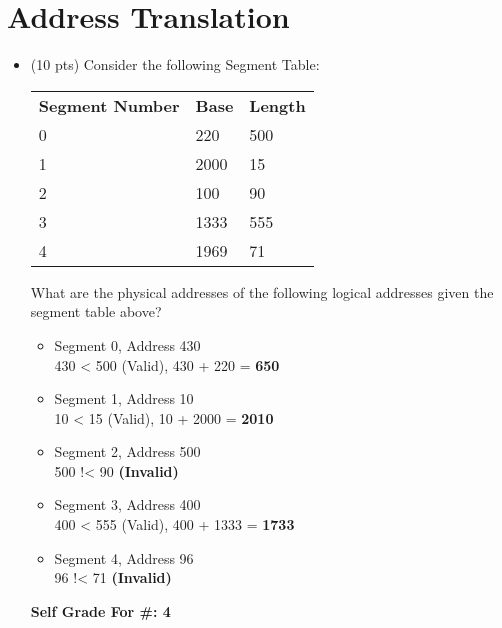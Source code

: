 \documentclass[conference]{IEEEtran}
\begin{document}
\section{Address Translation}
\begin{itemize}
	\item (10 pts) Consider the following Segment Table:
		\begin{table}[H]
			\centering
			\begin{tabular}{lll}
				\textbf{Segment Number} & \textbf{Base} & \textbf{Length} \\
				0 & 220 & 500 \\
				1 & 2000 & 15 \\
				2 & 100 & 90 \\
				3 & 1333 & 555 \\
				4 & 1969 & 71
			\end{tabular}
		\end{table}
	
	What are the physical addresses of the following logical addresses given the segment table
	above?
	\begin{itemize} 
		\item {Segment 0, Address 430} \\	
		430 < 500 (Valid), 430 + 220 = \textbf{650}
		\item {Segment 1, Address 10} \\
		10 < 15 (Valid), 10 + 2000 = \textbf{2010} 
		\item {Segment 2, Address 500} \\
		500 !< 90 \textbf{(Invalid)} 
		\item {Segment 3, Address 400} \\
		400 < 555 (Valid), 400 + 1333 = \textbf{1733}
		\item {Segment 4, Address 96} \\
		96 !< 71 \textbf{(Invalid)}
	\end{itemize} 

\begin{center}
\textbf{Self Grade For \#: 4}
\end{center}


\end{itemize}
\end{document}
